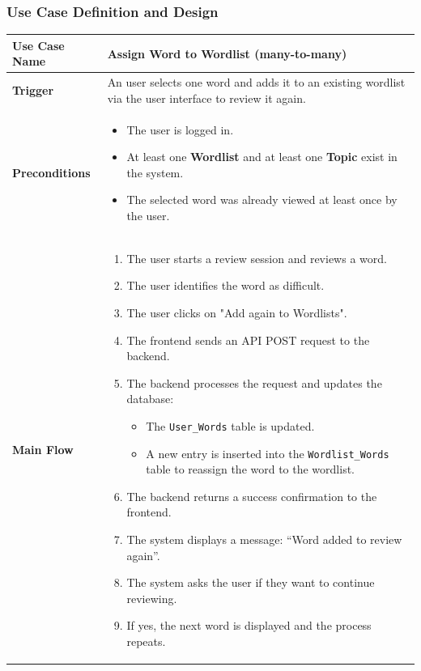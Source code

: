 \documentclass[a4paper, 11pt]{article}
\begin{document}
\subsubsection{Use Case Definition and Design}
\begin{tabular}{@{}lp{10cm}@{}}
\toprule
\textbf{Use Case Name} & Assign Word to Wordlist (many-to-many) \\
\midrule
\textbf{Trigger} & An user selects one word and adds it
                   to an existing wordlist via the user interface to review it again. \\[4pt]
\textbf{Preconditions} &
  \begin{minipage}[t]{10cm}
    \begin{itemize}
      \item The user is logged in.
      \item At least one \textbf{Wordlist} and at least one \textbf{Topic} exist in
            the system.
      \item The selected word was already viewed at least once by the user.
    \end{itemize}
  \end{minipage} \\[4pt]
\textbf{Main Flow} &
\begin{minipage}[t]{10cm}
\begin{enumerate}
  \item The user starts a review session and reviews a word.
  \item The user identifies the word as difficult.
  \item The user clicks on "Add again to Wordlists".
  \item The frontend sends an API POST request to the backend.
  \item The backend processes the request and updates the database:
  \begin{itemize}
      \item The \texttt{User\_Words} table is updated.
      \item A new entry is inserted into the \texttt{Wordlist\_Words} table to reassign the word to the wordlist.
  \end{itemize}
  \item The backend returns a success confirmation to the frontend.
  \item The system displays a message: “Word added to review again”.
  \item The system asks the user if they want to continue reviewing.
  \item If yes, the next word is displayed and the process repeats.

\end{enumerate}
\end{minipage}
\end{tabular}
\end{document}
